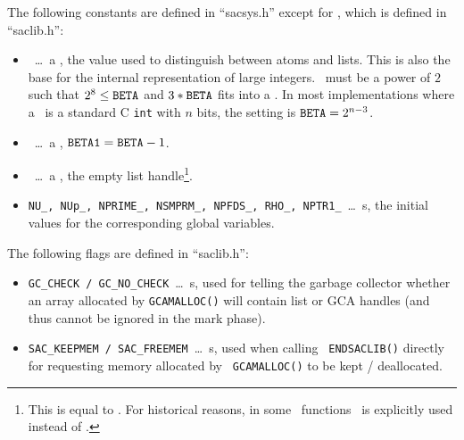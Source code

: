 The following constants are defined in ``sacsys.h'' except for \NIL, which
is defined in ``saclib.h'':
\begin{itemize}
\item
  \BETA\index{\BETA}\ \ldots\ a \Word, the value used to distinguish between
  atoms and lists. This is also the base for the internal representation of
  large integers. \BETA\ must be a power of $2$ such that $2^8 \leq {\tt BETA}$ and
  $3 * {\tt BETA}$ fits into a \Word. In most implementations where a \Word\ is a
  standard C {\tt int} with $n$ bits, the setting is ${\tt BETA} = 2^{n-3}$.
\item
  \BETAone\ \ldots\ a \Word, ${\tt BETA1} = {\tt BETA} - 1$.
\item
  \NIL\index{\NIL}\ \ldots\ a \Word, the empty list handle\footnote{
    This is equal to \BETA. For historical reasons, in some \saclib\
    functions \BETA\ is explicitly used instead of \NIL.
  }.
\item
  {\tt NU\_, NUp\_, NPRIME\_, NSMPRM\_, NPFDS\_, RHO\_, NPTR1\_}\ \ldots\
  \Word s, the initial values for the corresponding global variables.
\end{itemize}

The following flags are defined in ``saclib.h'':
\begin{itemize}
\item
  {\tt GC\_CHECK / GC\_NO\_CHECK}\ \ldots\ \Word s, used for telling the
  garbage collector whether an array allocated by {\tt GCAMALLOC()} will
  contain list or GCA handles (and thus cannot be ignored in the mark
  phase).
\item
  {\tt SAC\_KEEPMEM / SAC\_FREEMEM}\ \ldots\ \Word s, used when calling {\tt
  ENDSACLIB()} directly for requesting memory allocated by {\tt
  GCAMALLOC()} to be kept / deallocated.
\end{itemize}

